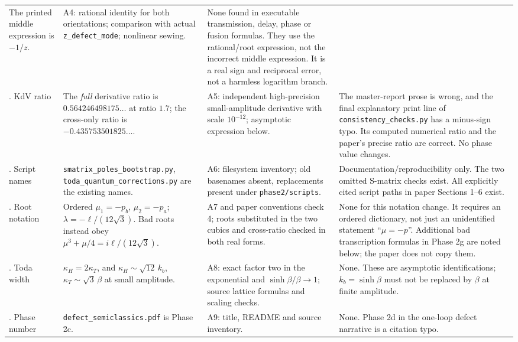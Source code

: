 \documentclass[11pt,a4paper]{article}
\newcommand{\file}[1]{\nolinkurl{#1}}
\begin{document}
\begin{longtable}{@{}L{1.4cm}L{3.7cm}L{3.9cm}L{6.0cm}@{}}
The printed middle expression is $-1/z$. &
A4: rational identity for both orientations; comparison with actual
\file{z_defect_mode}; nonlinear sewing. &
None found in executable transmission, delay, phase or fusion formulas.
They use the rational/root expression, not the incorrect middle expression.
It is a real sign and reciprocal error, not a harmless logarithm branch.\\. KdV ratio &
The \emph{full} derivative ratio is $0.564246498175\ldots$ at ratio $1.7$;
the cross-only ratio is $-0.435753501825\ldots$. &
A5: independent high-precision small-amplitude derivative with scale
$10^{-12}$; asymptotic expression below. &
The master-report prose is wrong, and the final explanatory print line of
\file{consistency_checks.py} has a minus-sign typo. Its computed numerical
ratio and the paper's precise ratio are correct. No phase value changes.\\. Script names &
\file{smatrix_poles_bootstrap.py}, \file{toda_quantum_corrections.py} are the
existing names. &
A6: filesystem inventory; old basenames absent, replacements present under
\file{phase2/scripts}. &
Documentation/reproducibility only. The two omitted S-matrix checks exist.
All explicitly cited script paths in paper Sections 1--6 exist.\\. Root notation &
Ordered $\mu_1=-p_b$, $\mu_2=-p_a$;
$\lambda=-\ell/(12\sqrt3)$. Bad roots instead obey
$\mu^3+\mu/4=i\ell/(12\sqrt3)$. &
A7 and paper conventions check 4; roots substituted in the two cubics and
cross-ratio checked in both real forms. &
None for this notation change. It requires an ordered dictionary, not just
an unidentified statement ``$\mu=-p$''. Additional bad transcription
formulas in Phase 2g are noted below; the paper does not copy them.\\. Toda width &
$\kappa_H=2\kappa_T$, and
$\kappa_H\sim\sqrt{12}\,k_b$, $\kappa_T\sim\sqrt3\,\beta$ at small amplitude. &
A8: exact factor two in the exponential and
$\sinh\beta/\beta\to1$; source lattice formulas and scaling checks. &
None. These are asymptotic identifications; $k_b=\sinh\beta$ must not be
replaced by $\beta$ at finite amplitude.\\. Phase number &
\file{defect_semiclassics.pdf} is Phase 2c. &
A9: title, README and source inventory. &
None. Phase 2d in the one-loop defect narrative is a citation typo.\\
\bottomrule
\end{longtable}
\normalsize
\end{document}
